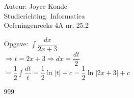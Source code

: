 \documentclass[a4paper]{article}
\begin{document}
  
\noindent \large Auteur: Joyce Konde \\
\noindent \large Studierichting: Informatica\\
\noindent \large Oefeningenreeks 4A nr. 25.2\\

\medskip

\normalsize

\newcommand{\dint}{\displaystyle\int}

\medskip

\normalsize

Opgave: $\dint \dfrac{dx}{2x + 3}$\\

$\Rightarrow t = 2x + 3 \Rightarrow dx = \dfrac{dt}{2}$\\

$= \dfrac{1}{2} \dint \dfrac{dt}{t} = \dfrac{1}{2}\ln |t| + c = \dfrac{1}{2}\ln |2x + 3| + c$\\

\begin{thebibliography}{999}
\end{thebibliography}
\end{document}
